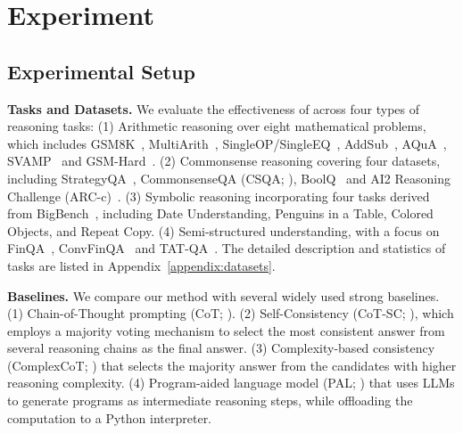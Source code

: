 \section{Experiment}

\subsection{Experimental Setup}

\textbf{Tasks and Datasets.}
We evaluate the effectiveness of \ours across four types of reasoning tasks:
(1) Arithmetic reasoning over eight mathematical problems, 
which includes GSM8K~\citep{cobbe2021gsm8k}, MultiArith~\citep{roy2015multiarith}, 
SingleOP/SingleEQ~\citep{koncel2016mawps}, 
AddSub~\citep{hosseini2014addsub}, 
AQuA~\citep{ling2017aqua}, 
SVAMP~\citep{patel2021svamp} and GSM-Hard~\citep{gao2022pal}.
(2) Commonsense reasoning covering four datasets,
including StrategyQA~\citep{geva2021strategyqa},
CommonsenseQA (CSQA; \citealp{talmor2019commonsenseqa}),
BoolQ~\citep{clark2019boolq} and AI2 Reasoning Challenge (ARC-c)~\citep{clark2018think}.
(3) Symbolic reasoning incorporating four tasks derived from BigBench~\citep{srivastava2023bb, suzgun2023bbh}, including Date Understanding, 
Penguins in a Table, 
Colored Objects, 
and Repeat Copy. 
(4) Semi-structured understanding, with a focus on FinQA~\citep{chen2021finqa}, ConvFinQA~\citep{chen2022convfinqa} and TAT-QA~\citep{zhu2021tatqa}.
The detailed description and statistics of tasks are listed in Appendix~\ref{appendix:datasets}.

\textbf{Baselines.}
We compare our method with several widely used strong baselines.
(1) Chain-of-Thought prompting (CoT; \citealp{wei2022chain}).
(2) Self-Consistency (CoT-SC; \citealp{wang2023sc}), which employs a majority voting mechanism to select the most consistent answer from several reasoning chains as the final answer.
(3) Complexity-based consistency (ComplexCoT; \citealp{fu2023complexcot}) that selects the majority answer from the candidates with higher reasoning complexity.
(4) Program-aided language model (PAL; \citealp{gao2022pal,chen2022program}) that uses LLMs to generate programs as intermediate reasoning steps,
while offloading the computation to a Python interpreter.

